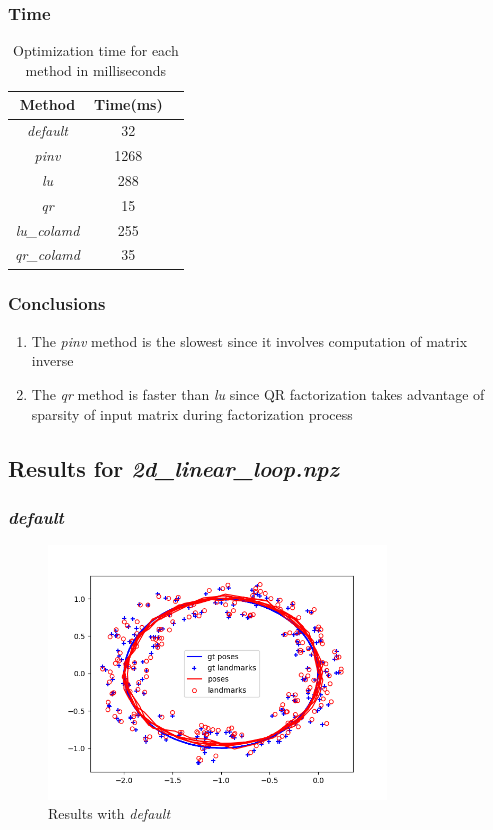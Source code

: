 \documentclass[12pt, a4paper]{article}
\begin{document}
\subsubsection{Time}
\begin{table}[H]
  \centering
  \begin{tabular}{|c|c|c|}
  \hline
  \textbf{Method} & \textbf{Time(ms)}\\
  \hline
  \textit{default} & 32\\\hline
  \textit{pinv} & 1268\\\hline
  \textit{lu} & 288\\\hline
  \textit{qr} & 15\\\hline
  \textit{lu\_colamd} & 255\\\hline
  \textit{qr\_colamd} & 35\\\hline
  \hline
  \end{tabular}
  \caption{Optimization time for each method in milliseconds}
  \end{table}
\subsubsection{Conclusions}
\begin{enumerate}
  \item The \textit{pinv} method is the slowest since it involves computation of matrix inverse
  \item The \textit{qr} method is faster than \textit{lu} since QR factorization takes advantage of sparsity of input matrix during factorization process

\end{enumerate}
\subsection{Results for \textit{2d\_linear\_loop.npz}}
\subsubsection{\textit{default}}
\begin{figure}[H]
  \centering
  \includegraphics[width=0.8\textwidth]{./results/linear/default_2d_linear_loop_map.png}
  \caption{Results with \textit{default}}
\end{figure}
\end{document}
